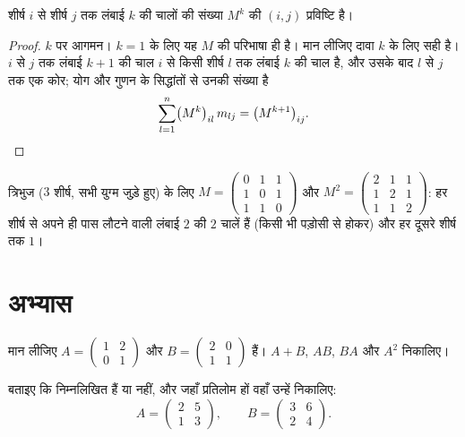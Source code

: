 \begin{theorem}[चालें गिनना]\label{thm:g12:matrix:walks}
शीर्ष $i$ से शीर्ष $j$ तक लंबाई $k$ की चालों की संख्या $M^k$ की $(i,j)$
प्रविष्टि है।
\end{theorem}

\begin{proof}
$k$ पर आगमन। $k = 1$ के लिए यह $M$ की परिभाषा ही है। मान लीजिए दावा $k$
के लिए सही है। $i$ से $j$ तक लंबाई $k+1$ की चाल $i$ से किसी शीर्ष $l$
तक लंबाई $k$ की चाल है, और उसके बाद $l$ से $j$ तक एक कोर; योग और गुणन
के सिद्धांतों से उनकी संख्या है
\[
\sum_{l=1}^{n} \bigl(M^k\bigr)_{il}\, m_{lj} = \bigl(M^{k+1}\bigr)_{ij}.
\qedhere
\]
\end{proof}

\begin{example}
त्रिभुज  ($3$ शीर्ष, सभी युग्म जुड़े हुए) के लिए $M = \begin{pmatrix} 0&1&1\\ 1&0&1\\ 1&1&0\end{pmatrix}$ और $M^2 = \begin{pmatrix} 2&1&1\\ 1&2&1\\ 1&1&2\end{pmatrix}$: हर
शीर्ष से अपने ही पास लौटने वाली लंबाई $2$ की $2$ चालें हैं (किसी भी
पड़ोसी से होकर) और हर दूसरे शीर्ष तक $1$।
\end{example}

\section{अभ्यास}

\begin{exercise}[$\star$]\label{exo:g12:matrix:1}
मान लीजिए $A = \begin{pmatrix} 1 & 2\\ 0 & 1 \end{pmatrix}$ और $B = \begin{pmatrix} 2 & 0\\ 1 & 1 \end{pmatrix}$ हैं। $A + B$, $AB$, $BA$ और $A^2$ निकालिए।
\end{exercise}

\begin{exercise}[$\star$]\label{exo:g12:matrix:2}
बताइए कि निम्नलिखित   हैं या नहीं, और जहाँ प्रतिलोम हों वहाँ
उन्हें निकालिए:
\[
A = \begin{pmatrix} 2 & 5\\ 1 & 3\end{pmatrix}, \qquad
B = \begin{pmatrix} 3 & 6\\ 2 & 4\end{pmatrix}.
\]
\end{exercise}

